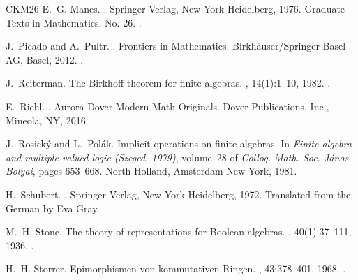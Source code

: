 \documentclass[a4paper,10pt,reqno]{amsart}
\theoremstyle{definition}
\theoremstyle{remark}
\begin{document}
\begin{thebibliography}{CKM26}
E.~G. Manes.
.
\newblock Springer-Verlag, New York-Heidelberg, 1976.
\newblock Graduate Texts in Mathematics, No. 26.
\newblock \href {https://doi.org/10.1007/978-1-4612-9860-1}
  {}.

J.~Picado and A.~Pultr.
.
\newblock Frontiers in Mathematics. Birkh\"auser/Springer Basel AG, Basel,
  2012.
\newblock \href {https://doi.org/10.1007/978-3-0348-0154-6}
  {}.

J.~Reiterman.
\newblock The {B}irkhoff theorem for finite algebras.
, 14(1):1--10, 1982.
\newblock \href {https://doi.org/10.1007/BF02483902}
  {}.

E.~Riehl.
.
\newblock Aurora Dover Modern Math Originals. Dover Publications, Inc.,
  Mineola, NY, 2016.

J.~Rosick\'y and L.~Pol\'ak.
\newblock Implicit operations on finite algebras.
\newblock In {\em Finite algebra and multiple-valued logic ({S}zeged, 1979)},
  volume~28 of {\em Colloq. Math. Soc. J\'anos Bolyai}, pages 653--668.
  North-Holland, Amsterdam-New York, 1981.

H.~Schubert.
.
\newblock Springer-Verlag, New York-Heidelberg, 1972.
\newblock Translated from the German by Eva Gray.

M.~H. Stone.
\newblock The theory of representations for {B}oolean algebras.
, 40(1):37--111, 1936.
\newblock \href {https://doi.org/10.1090/S0002-9947-1936-1501865-8}
  {}.

H.~H. Storrer.
\newblock Epimorphismen von kommutativen {R}ingen.
, 43:378--401, 1968.
\newblock \href {https://doi.org/10.1007/BF02564404}
  {}.

\end{thebibliography}
\end{document}
